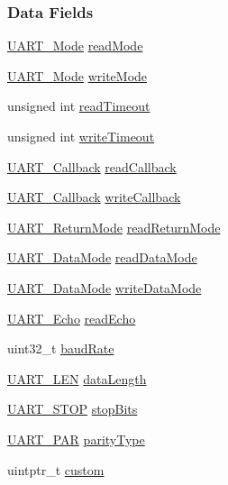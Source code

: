 \subsubsection*{Data Fields}
\begin{DoxyCompactItemize}
\item 
\hyperlink{_u_a_r_t_8h_a2507a620dba95cd20885c52494d19e90}{U\+A\+R\+T\+\_\+\+Mode} \hyperlink{struct_u_a_r_t___params_ab8677572499b3734fcaa00f6431b0e7b}{read\+Mode}
\item 
\hyperlink{_u_a_r_t_8h_a2507a620dba95cd20885c52494d19e90}{U\+A\+R\+T\+\_\+\+Mode} \hyperlink{struct_u_a_r_t___params_a53a95d4c2266d6e7ecea6640baf92d40}{write\+Mode}
\item 
unsigned int \hyperlink{struct_u_a_r_t___params_a10875d91873fb77106bde0b799f961e2}{read\+Timeout}
\item 
unsigned int \hyperlink{struct_u_a_r_t___params_a7a721cf5229c7c41074d262107cae501}{write\+Timeout}
\item 
\hyperlink{_u_a_r_t_8h_a44620a9d91e0357ebc6f0a79984d9e1e}{U\+A\+R\+T\+\_\+\+Callback} \hyperlink{struct_u_a_r_t___params_a5457b86b6793f1c4757457b9b22e379d}{read\+Callback}
\item 
\hyperlink{_u_a_r_t_8h_a44620a9d91e0357ebc6f0a79984d9e1e}{U\+A\+R\+T\+\_\+\+Callback} \hyperlink{struct_u_a_r_t___params_a0497d8a55aea66d3ab2118f8966e8e33}{write\+Callback}
\item 
\hyperlink{_u_a_r_t_8h_acb5a82843435a1b5d51b6c27028d914f}{U\+A\+R\+T\+\_\+\+Return\+Mode} \hyperlink{struct_u_a_r_t___params_a47382bd027b944868ce873ad71d29d0e}{read\+Return\+Mode}
\item 
\hyperlink{_u_a_r_t_8h_a694090fdb166f94ac30b809f9cba87b8}{U\+A\+R\+T\+\_\+\+Data\+Mode} \hyperlink{struct_u_a_r_t___params_a707659dcecb10f490000511ec2de2060}{read\+Data\+Mode}
\item 
\hyperlink{_u_a_r_t_8h_a694090fdb166f94ac30b809f9cba87b8}{U\+A\+R\+T\+\_\+\+Data\+Mode} \hyperlink{struct_u_a_r_t___params_a02e8b9127a7d6fa49021f01a7ee69ad2}{write\+Data\+Mode}
\item 
\hyperlink{_u_a_r_t_8h_aac6a03c2e1d76f53e1d9d923dcdc24f2}{U\+A\+R\+T\+\_\+\+Echo} \hyperlink{struct_u_a_r_t___params_a61642ef82bbcfc98494739a98afff58a}{read\+Echo}
\item 
uint32\+\_\+t \hyperlink{struct_u_a_r_t___params_afadb98d0a0ef6e17240bab79306e7828}{baud\+Rate}
\item 
\hyperlink{_u_a_r_t_8h_adf245d5f10db0abcbd8ad62a0d80c694}{U\+A\+R\+T\+\_\+\+L\+E\+N} \hyperlink{struct_u_a_r_t___params_adb937e0b27c71886e58953312d3d1376}{data\+Length}
\item 
\hyperlink{_u_a_r_t_8h_a176b71ca19bc13d7534fa30fc18c2243}{U\+A\+R\+T\+\_\+\+S\+T\+O\+P} \hyperlink{struct_u_a_r_t___params_a59f12dc5b7329f484573521c0e2b3d78}{stop\+Bits}
\item 
\hyperlink{_u_a_r_t_8h_ac70b5aa75500b8c45a51ec560deccfc4}{U\+A\+R\+T\+\_\+\+P\+A\+R} \hyperlink{struct_u_a_r_t___params_acaa90dc09cd820477c5bfaae152a2010}{parity\+Type}
\item 
uintptr\+\_\+t \hyperlink{struct_u_a_r_t___params_a9ca9d3b9e9a3c0a73704f79278703abb}{custom}
\end{DoxyCompactItemize}


